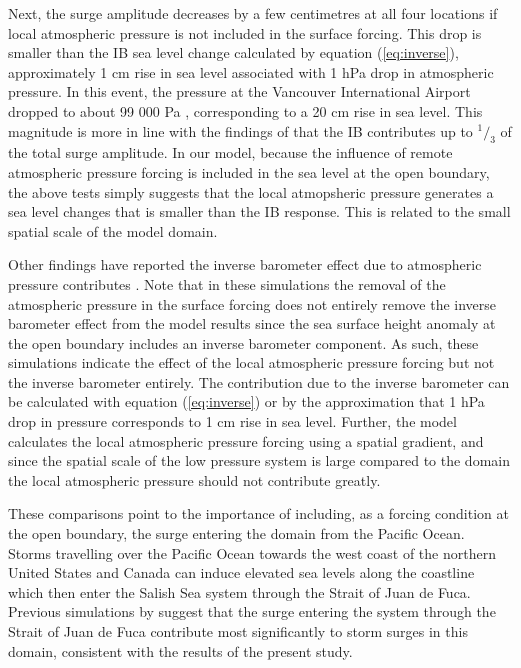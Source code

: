 \documentclass{tATO2e}
\begin{document}
Next, the surge amplitude decreases by a few centimetres at all four locations if local atmospheric pressure is not included in the surface forcing. This drop is smaller than the IB sea level change calculated by equation (\ref{eq:inverse}), approximately 1 cm rise in sea level associated with 1 hPa drop in atmospheric pressure. In this event, the pressure at the Vancouver International Airport dropped to about 99 000 Pa \citep{ECClimateArchive}, corresponding to a 20 cm rise in sea level. This magnitude is more in line with the findings of \citep{murty1995storm} that the IB contributes up to $^1/_3$ of the total surge amplitude. In our model, because the influence of remote atmospheric pressure forcing is included in the sea level at the open boundary, the above tests simply suggests that the local atmopsheric pressure generates a sea level changes that is smaller than the IB response. This is related to the small spatial scale of the model domain.  

Other findings have reported the inverse barometer effect due to atmospheric pressure contributes \citep{murty1995storm}. Note that in these simulations the removal of the atmospheric pressure in the surface forcing does not entirely remove the inverse barometer effect from the model results since the sea surface height anomaly at the open boundary includes an inverse barometer component. As such, these simulations indicate the effect of the local atmospheric pressure forcing but not the inverse barometer entirely. The contribution due to the inverse barometer can be calculated with equation (\ref{eq:inverse}) or by the approximation that 1 hPa drop in pressure corresponds to 1 cm rise in sea level. Further, the model calculates the local atmospheric pressure forcing using a spatial gradient, and since the spatial scale of the low pressure system is large compared to the domain the local atmospheric pressure should not contribute greatly. 

These comparisons point to the importance of including, as a forcing condition at the open boundary, the surge entering the domain from the Pacific Ocean. Storms travelling over the Pacific Ocean towards the west coast of the northern United States and Canada can induce elevated sea levels along the coastline which then enter the Salish Sea system through the Strait of Juan de Fuca. Previous simulations by \citet{murty1995storm} suggest that the surge entering the system through the Strait of Juan de Fuca contribute most significantly to storm surges in this domain, consistent with the results of the present study.  
\end{document}
